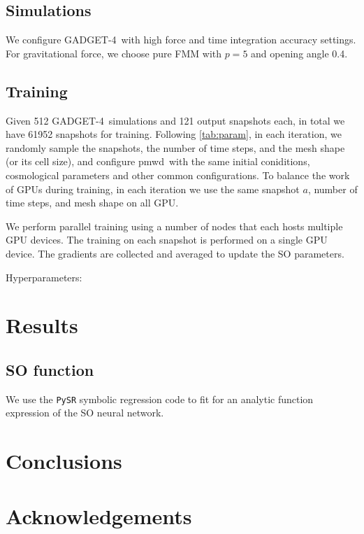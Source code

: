 \documentclass[usenatbib]{mnras}
\newcommand{\pmwd}{{\usefont{T1}{nova}{m}{sl}pmwd}}
\newcommand{\GADGET}{{{\fontsize{7.7pt}{9pt}\selectfont GADGET}-4}}
\begin{document}
\subsection{Simulations}

\citet{GADGET-4}

We configure \GADGET\ with high force and time integration accuracy
settings.
For gravitational force, we choose pure FMM with $p=5$ and opening angle
0.4.


\subsection{Training}

Given 512 \GADGET\ simulations and 121 output snapshots each, in total
we have 61952 snapshots for training.
Following \autoref{tab:param}, in each iteration, we randomly sample the
snapshots, the number of time steps, and the mesh shape (or its cell
size), and configure \pmwd\ with the same initial coniditions,
cosmological parameters and other common configurations.
To balance the work of GPUs during training, in each iteration we use
the same snapshot $a$, number of time steps, and mesh shape on all GPU.

We perform parallel training using a number of nodes that each hosts
multiple GPU devices.
The training on each snapshot is performed on a single GPU device.
The gradients are collected and averaged to update the SO parameters.

Hyperparameters:


\section{Results}

\subsection{SO function}

We use the \texttt{PySR} \citep{Cranmer2023} symbolic regression code to
fit for an analytic function expression of the SO neural network.



\section{Conclusions}


\section*{Acknowledgements}
\end{document}
